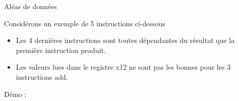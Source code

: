 %
\begin{Frame}{Aléas de données} 

  \begin{block}{Considérons un exemple de 5 instructions ci-dessous}
    \begin{center}
      \begin{itemize}
      \item Les 4 dernières instructions sont toutes dépendantes du résultat que la première instruction produit.
      \item Les valeurs lues dans le registre x12 ne sont pas les bonnes pour les 3 instructions add.
      \end{itemize}
    \end{center}
  \end{block}   
  
  \begin{block}{Démo : }
  \end{block}
\end{Frame}


